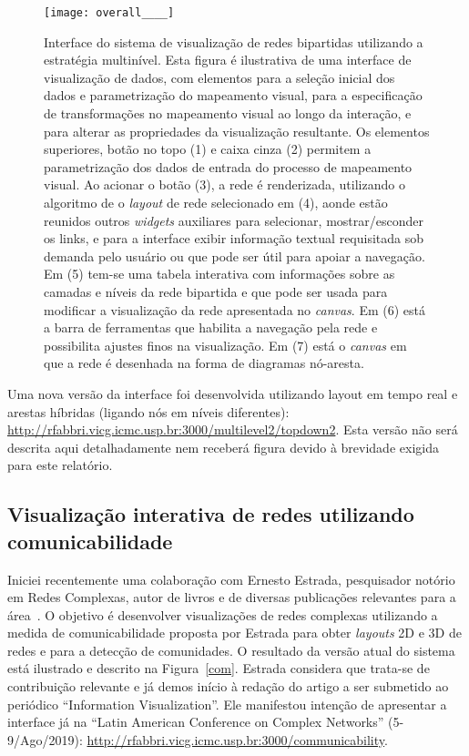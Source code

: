 \documentclass[a4paper, 11pt]{article}
\begin{document}
\begin{figure}[h!]
\centering
  \texttt{[image: overall\_\_\_\_]}
\caption{%
  Interface do sistema de visualização de redes bipartidas utilizando a estratégia multinível.
  Esta figura é ilustrativa de uma interface de visualização de dados, com elementos para a seleção inicial dos dados e parametrização do mapeamento visual, para a especificação de transformações no mapeamento visual ao longo da interação, e para alterar as propriedades da visualização resultante.
  Os elementos superiores, botão no topo (1) e caixa cinza (2) permitem a parametrização dos dados de entrada do processo de mapeamento visual.
  Ao acionar o botão (3), a rede é renderizada, utilizando o algoritmo de o \emph{layout} de rede selecionado em (4), aonde estão reunidos outros \emph{widgets} auxiliares para selecionar,
  mostrar/esconder os links,
  e para a interface exibir informação textual requisitada sob demanda
  pelo usuário ou que pode ser útil para apoiar a navegação.
  Em (5) tem-se uma tabela interativa com informações sobre as camadas e níveis
  da rede bipartida e que pode ser usada para modificar a visualização da rede apresentada no \emph{canvas}.
  Em (6) está a barra de ferramentas que habilita a navegação pela rede e
  possibilita ajustes finos na visualização.
  Em (7) está o \emph{canvas} em que a rede é desenhada na forma de diagramas nó-aresta.
}\label{ml}
\end{figure}

Uma nova versão da interface foi desenvolvida utilizando layout em tempo real e arestas híbridas (ligando nós em níveis diferentes):
\url{http://rfabbri.vicg.icmc.usp.br:3000/multilevel2/topdown2}. Esta versão não será descrita aqui detalhadamente nem receberá figura devido à brevidade
exigida para este relatório.

\subsection{Visualização interativa de redes utilizando comunicabilidade}\label{scom}
Iniciei recentemente uma colaboração com Ernesto Estrada, pesquisador notório em Redes Complexas, autor de livros e de diversas publicações relevantes para a área~\cite{ern1,ern2,ern3,ern4}.
O objetivo é desenvolver visualizações de redes complexas utilizando a medida de comunicabilidade proposta por Estrada para obter \textit{layouts} 2D e 3D de redes e para a detecção de comunidades. O resultado da versão atual do sistema está ilustrado e descrito na Figura~\ref{com}.
Estrada considera que trata-se de contribuição relevante e já demos início à redação do artigo a ser submetido ao periódico ``Information Visualization''.
Ele manifestou intenção de apresentar a interface já na ``Latin American Conference on Complex Networks'' (5-9/Ago/2019):
\url{http://rfabbri.vicg.icmc.usp.br:3000/communicability}.
\end{document}
